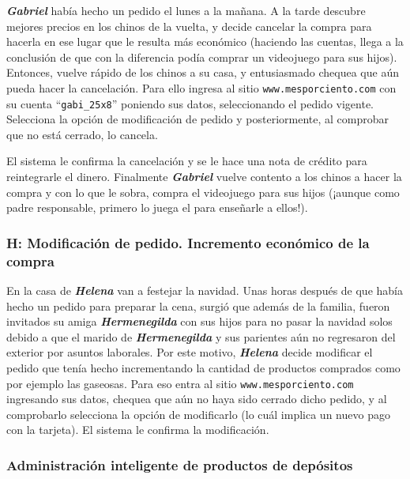 \textbf{\emph{Gabriel}} había hecho un pedido el lunes a la mañana. A la tarde
descubre mejores precios en los chinos de la vuelta, y decide cancelar la compra
para hacerla en ese lugar que le resulta más económico (haciendo las cuentas,
llega a la conclusión de que con la diferencia podía comprar un videojuego para
sus hijos). Entonces, vuelve rápido de los chinos a su casa, y entusiasmado
chequea que aún pueda hacer la cancelación. Para ello ingresa al sitio
\texttt{www.mesporciento.com} con su cuenta ``\texttt{gabi\_25x8}'' poniendo sus
datos, seleccionando el pedido vigente. Selecciona la opción de modificación de
pedido y posteriormente, al comprobar que no está cerrado, lo cancela.

El sistema le confirma la cancelación y se le hace una nota de crédito para reintegrarle el dinero. Finalmente 
\textbf{\emph{Gabriel}} vuelve contento a los chinos a hacer la compra y con lo que le sobra, compra el
videojuego para sus hijos (¡aunque como padre responsable, primero lo juega el para enseñarle a ellos!).

\subsubsection{H: Modificación de pedido. Incremento económico de la compra}

En la casa de \textbf{\emph{Helena}} van a festejar la navidad. Unas horas
después de que había hecho un pedido para preparar la cena, surgió que además de
la familia, fueron invitados su amiga \textbf{\emph{Hermenegilda}} con sus hijos
para no pasar la navidad solos debido a que el marido de
\textbf{\emph{Hermenegilda}} y sus parientes aún no regresaron del exterior por
asuntos laborales. Por este motivo, \textbf{\emph{Helena}} decide modificar el
pedido que tenía hecho incrementando la cantidad de productos comprados como por
ejemplo las gaseosas. Para eso entra al sitio \texttt{www.mesporciento.com}
ingresando sus datos, chequea que aún no haya sido cerrado dicho pedido, y al
comprobarlo selecciona la opción de modificarlo (lo cuál implica un nuevo pago con la tarjeta). El sistema le confirma la
modificación.

\subsubsection{Administración inteligente de productos de depósitos}


